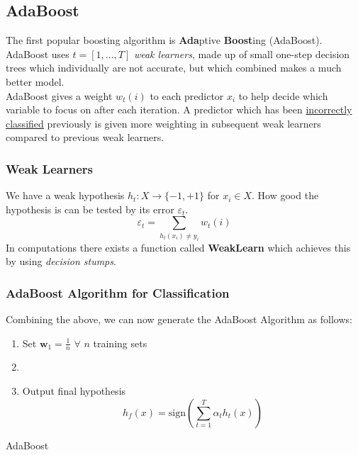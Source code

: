 \documentclass[11pt,a4paper]{report}
\begin{document}
\subsection{AdaBoost}
The first popular boosting algorithm is \textbf{Ada}ptive \textbf{Boost}ing \cite{adaboost} (AdaBoost). 
AdaBoost uses $t = [1,\dots,T]$ \textit{weak learners}, made up of small one-step decision trees which individually are not accurate, but which combined makes a much better model.
\medskip\\
AdaBoost gives a weight $w_t (i)$ to each predictor $x_i$ to help decide which variable to focus on after each iteration.
A predictor which has been {\color{red} \underline{incorrectly classified}} previously is given more weighting in subsequent weak learners compared to previous weak learners.

\subsubsection{Weak Learners}
We have a weak hypothesis $h_t : X \rightarrow \{-1,+1\}$ for $x_i \in X$.
How good the hypothesis is can be tested by its error $\varepsilon_t$.
\begin{equation}
   \varepsilon_t = \sum_{h_t (x_i) \neq y_i} w_t (i) 
   \label{eq:weaklearn}
\end{equation}
In computations there exists a function called \textbf{WeakLearn} which achieves this by using \textit{decision stumps}.

\subsubsection{AdaBoost Algorithm for Classification}
Combining the above, we can now generate the AdaBoost Algorithm as follows:
\begin{algorithm}
\SetAlgoLined
\begin{enumerate}
    \item Set $\textbf{w}_1 = \frac{1}{n}$ $\forall$ $n$ training sets
    
    \item {}
    
    \item Output final hypothesis
    \[ h_f (x) = \text{sign} \left(\sum_{t=1}^T \alpha_t h_t (x) \right) \]
\end{enumerate}
\caption{AdaBoost}
\end{algorithm}
\end{document}
